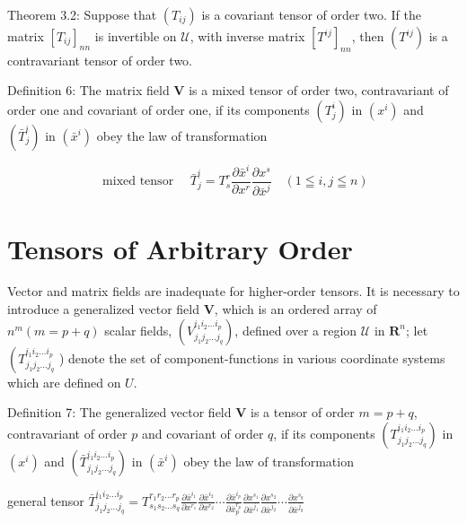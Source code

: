 \documentclass[10pt]{article}
\begin{document}
Theorem 3.2: Suppose that $\left(T_{i j}\right)$ is a covariant tensor of order two. If the matrix $\left[T_{i j}\right]_{n n}$ is invertible on $\mathscr{U}$, with inverse matrix $\left[T^{i j}\right]_{n n}$, then $\left(T^{i j}\right)$ is a contravariant tensor of order two.

Definition 6: The matrix field $\mathbf{V}$ is a mixed tensor of order two, contravariant of order one and covariant of order one, if its components $\left(T_{j}^{i}\right)$ in $\left(x^{i}\right)$ and $\left(\bar{T}_{j}^{i}\right)$ in $\left(\bar{x}^{i}\right)$ obey the law of transformation


\begin{equation*}
\text { mixed tensor } \quad \bar{T}_{j}^{i}=T_{s}^{r} \frac{\partial \bar{x}^{i}}{\partial x^{r}} \frac{\partial x^{s}}{\partial \bar{x}^{j}} \quad(1 \leqq i, j \leqq n) \tag{3.13}
\end{equation*}


\section*{Tensors of Arbitrary Order}
Vector and matrix fields are inadequate for higher-order tensors. It is necessary to introduce a generalized vector field $\mathbf{V}$, which is an ordered array of $n^{m}(m=p+q)$ scalar fields, $\left(V_{j_{1} j_{2} \ldots j_{q}}^{i_{1} i_{2} \ldots i_{p}}\right)$, defined over a region $\mathcal{U}$ in $\mathbf{R}^{n}$; let $\left(T_{j_{1} j_{2} \ldots j_{q}}^{i_{1} i_{2} \ldots i_{p}}\right.$ ) denote the set of component-functions in various coordinate systems which are defined on $U$.

Definition 7: The generalized vector field $\mathbf{V}$ is a tensor of order $m=p+q$, contravariant of order $p$ and covariant of order $q$, if its components $\left(T_{j_{1} j_{2} \ldots j_{q}}^{i_{1} i_{2} \ldots i_{p}}\right)$ in $\left(x^{i}\right)$ and $\left(\bar{T}_{j_{1} j_{2} \ldots j_{q}}^{i_{1} i_{2} \ldots i_{p}}\right)$ in $\left(\bar{x}^{i}\right)$ obey the law of transformation

general tensor $\bar{T}_{j_{1} j_{2} \ldots j_{q}}^{i_{1} i_{2} \ldots i_{p}}=T_{s_{1} s_{2} \ldots s_{q}}^{r_{1} r_{2} \ldots r_{p}} \frac{\partial \bar{x}^{i_{1}}}{\partial x^{r_{1}}} \frac{\partial \bar{x}^{i_{2}}}{\partial x^{r_{2}}} \cdots \frac{\partial \bar{x}^{i_{p}}}{\partial \bar{x}_{p}^{r_{p}}} \frac{\partial x^{s_{1}}}{\partial \bar{x}^{j_{1}}} \frac{\partial x^{s_{2}}}{\partial \bar{x}^{j_{2}}} \cdots \frac{\partial x^{s_{q}}}{\partial \bar{x}^{j_{q}}}$
\end{document}
